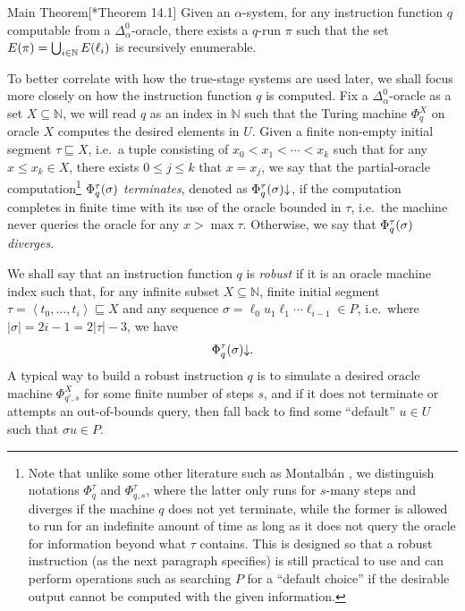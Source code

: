 \documentclass[11pt]{article}
\makeatletter
\theoremstyle{plain}
\newcommand{\@thistheoremname}{}
\newtheorem*{@theorem*}{\@thistheoremname}
\newenvironment{theorem*}[1]
  {\renewcommand{\@thistheoremname}{#1}%
   \begin{@theorem*}}
  {\end{@theorem*}}
\theoremstyle{definition}
\newcommand{\tuple}[1]{\left\langle #1 \right\rangle}
\makeatother
\begin{document}
\begin{theorem*}{Main Theorem}[\cite{ash-knight00-computable-structures}*{Theorem 14.1}]
  Given an $\alpha$-system, for any instruction function $q$ computable from a $\Delta^0_\alpha$-oracle, there exists a $q$-run $\pi$ such that the set $E\mleft(\pi\mright) = \bigcup_{i \in \mathbb{N}} E\mleft(\ell_i\mright)$ is recursively enumerable.
\end{theorem*}

To better correlate with how the true-stage systems are used later, we shall focus more closely on how the instruction function $q$ is computed. Fix a $\Delta^0_\alpha$-oracle as a set $X \subseteq \mathbb{N}$, we will read $q$ as an index in $\mathbb{N}$ such that the Turing machine $\Phi_q^X$ on oracle $X$ computes the desired elements in $U$. Given a finite non-empty initial segment $\tau \sqsubseteq X$, i.e.\ a tuple consisting of $x_0 < x_1 < \cdots < x_k$ such that for any $x \leq x_k \in X$, there exists $0 \leq j \leq k$ that $x = x_j$, we say that the partial-oracle computation\footnote{Note that unlike some other literature such as Montalb\'an \cites{montalban26-computable-structure}, we distinguish notations $\Phi_q^\tau$ and $\Phi_{q,s}^\tau$, where the latter only runs for $s$-many steps and diverges if the machine $q$ does not yet terminate, while the former is allowed to run for an indefinite amount of time as long as it does not query the oracle for information beyond what $\tau$ contains. This is designed so that a robust instruction (as the next paragraph specifies) is still practical to use and can perform operations such as searching $P$ for a ``default choice'' if the desirable output cannot be computed with the given information.} $\Phi_q^\tau\mleft(\sigma\mright)$ \emph{terminates}, denoted as $\Phi_q^\tau\mleft(\sigma\mright) {\downarrow}$, if the computation completes in finite time with its use of the oracle bounded in $\tau$, i.e.\ the machine never queries the oracle for any $x > \max \tau$. Otherwise, we say that $\Phi_q^\tau\mleft(\sigma\mright)$ \emph{diverges}.

We shall say that an instruction function $q$ is \emph{robust} if it is an oracle machine index such that, for any infinite subset $X \subseteq \mathbb{N}$, finite initial segment $\tau = \tuple{t_0, \ldots, t_i} \sqsubseteq X$ and any sequence $\sigma = \ell_0 u_1 \ell_1 \cdots \ell_{i - 1} \in P$, i.e.\ where $\left|\sigma\right| = 2i - 1 = 2\left|\tau\right| - 3$, we have
\[\Phi_q^\tau\mleft(\sigma\mright) {\downarrow}.\]
A typical way to build a robust instruction $q$ is to simulate a desired oracle machine $\Phi_{q',s}^X$ for some finite number of steps $s$, and if it does not terminate or attempts an out-of-bounds query, then fall back to find some ``default'' $u \in U$ such that $\sigma u \in P$.
\end{document}

